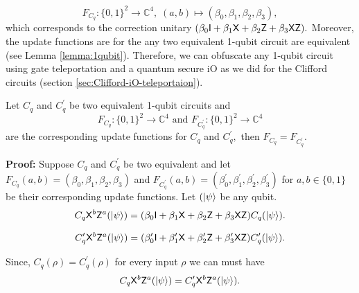\begin{equation*}
F_{C_q}:\{0,1\}^2\rightarrow \mathbb{C}^4,\; (a,b)\mapsto (\beta_0, \beta_1,\beta_2,\beta_3),
\end{equation*}
which corresponds to the correction unitary $(\beta_0 {\sf I} +  \beta_1 {\sf X} + \beta_2 {\sf Z} + \beta_3{\sf X} {\sf Z}).$
Moreover, the update functions are for the any two equivalent 1-qubit circuit are equivalent (see Lemma \ref{lemma:1qubit}). Therefore, we can obfuscate any 1-qubit circuit using gate teleportation and a quantum secure iO as we did for the Clifford circuits (section \ref{sec:Clifford-iO-teleportaion}).



\begin{lemma}
\label{lemma:1qubit}
Let $C_q$ and $C_q^\prime$ be two equivalent 1-qubit circuits and
\begin{equation*}
F_{C_q}:\{0,1\}^2\rightarrow \mathbb{C}^4 \mbox{ and } F_{C_q^\prime}:\{0,1\}^2\rightarrow \mathbb{C}^4
\end{equation*}
are the corresponding update functions for $C_q$ and $C_q^\prime,$  then $F_{C_q}=F_{C_q^\prime}.$
\end{lemma}

{\bf Proof:}  Suppose  $C_q$ and $C_q^\prime$ be two equivalent and let  $F_{C_q}(a,b)=(\beta_0, \beta_1, \beta_2, \beta_3)$ and $F_{C_q^\prime}(a,b)=(\beta_0^\prime, \beta_1^\prime, \beta_2^\prime, \beta_3^\prime)$ for $a,b\in\{0,1\}$ be their corresponding update functions. Let $({\lvert}\psi\rangle$ be any  qubit.
\begin{equation}
\label{lemma:1qubit:eq1}
\begin{aligned}
 C_q {\sf X}^b {\sf Z}^a({\lvert}\psi\rangle)=(\beta_0 {\sf I}+\beta_1 {\sf X}+\beta_2 {\sf Z}+\beta_3 {\sf X} {\sf Z})  C_q ({\lvert}\psi\rangle).\\
 \end{aligned}
\end{equation}

\begin{equation}
\label{lemma:1qubit:eq2}
\begin{aligned}
 C_q^\prime {\sf X}^b {\sf Z}^a({\lvert}\psi\rangle)=(\beta_0^\prime {\sf I}+\beta_1^\prime {\sf X}+\beta_2^\prime {\sf Z}+\beta_3^\prime {\sf X} {\sf Z})  C_q^\prime ({\lvert}\psi\rangle).
 \end{aligned}
\end{equation}

Since,  $C_q (\rho)=C_q^\prime (\rho)$ for every input $\rho$ we can must have
\begin{equation}
C_q {\sf X}^b {\sf Z}^a({\lvert}\psi\rangle)= C_q^\prime {\sf X}^b {\sf Z}^a({\lvert}\psi\rangle).
\end{equation}

